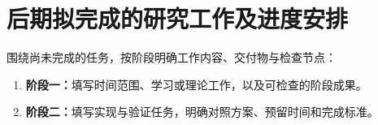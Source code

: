 \section{后期拟完成的研究工作及进度安排}
围绕尚未完成的任务，按阶段明确工作内容、交付物与检查节点：
\begin{enumerate}[label=(\arabic*),leftmargin=2.5em]
\item \textbf{阶段一：}填写时间范围、学习或理论工作，以及可检查的阶段成果。
\item \textbf{阶段二：}填写实现与验证任务，明确对照方案、预留时间和完成标准。
\end{enumerate}
